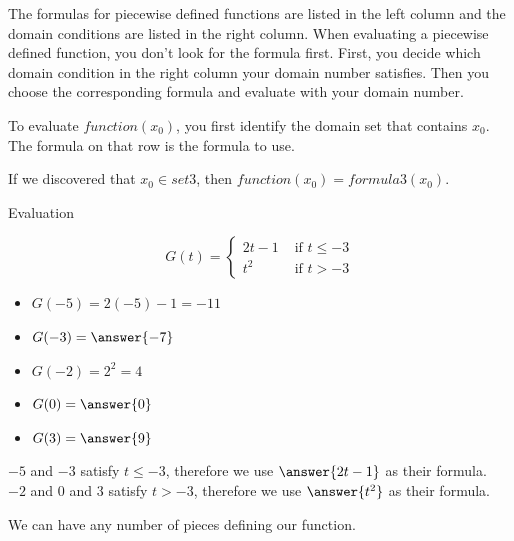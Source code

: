 \documentclass{ximera}
\begin{document}
The formulas for piecewise defined functions are listed in the left column and the domain conditions are listed in the right column.  When evaluating a piecewise defined function, you don't look for the formula first.  First, you decide which domain condition in the right column your domain number satisfies.  Then you choose the corresponding formula and evaluate with your domain number.


To evaluate $function(x_0)$, you first identify the domain set that contains $x_0$.  The formula on that row is the formula to use. 

If we discovered that $x_0 \in set3$, then $function(x_0) = formula3(x_0)$. 









\begin{example} Evaluation

\[
G(t) = 
\begin{cases}
  2t-1 & \text{ if } t \leq -3 \\
  t^2 & \text{ if } t > -3
\end{cases}
\]


\begin{itemize}
\item $G(-5) = 2(-5) - 1 = -11$  
\item $G(-3) = \answer{-7}$ 
\item $G(-2) = 2^2 = 4$ 
\item $G(0) = \answer{0}$ 
\item $G(3) = \answer{9}$ 
\end{itemize}


$-5$ and $-3$ satisfy $t \leq -3$, therefore we use $\answer{2t-1}$ as their formula. \\
$-2$ and $0$ and $3$ satisfy $t > -3$, therefore we use $\answer{t^2}$ as their formula. \\

\end{example}


We can have any number of pieces defining our function.
\end{document}
